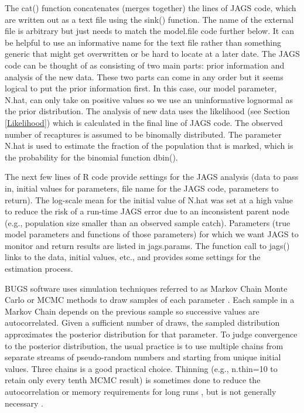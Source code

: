 \documentclass[
]{krantz}
\begin{document}
The cat() function concatenates (merges together) the lines of JAGS code, which are written out as a text file using the sink() function. The name of the external file is arbitrary but just needs to match the model.file code further below. It can be helpful to use an informative name for the text file rather than something generic that might get overwritten or be hard to locate at a later date. The JAGS code can be thought of as consisting of two main parts: prior information and analysis of the new data. These two parts can come in any order but it seems logical to put the prior information first. In this case, our model parameter, N.hat, can only take on positive values so we use an uninformative lognormal \citep{mccarthy2007} as the prior distribution. The analysis of new data uses the likelihood (see Section \ref{Likelihood}) which is calculated in the final line of JAGS code. The observed number of recaptures is assumed to be binomally distributed. The parameter N.hat is used to estimate the fraction of the population that is marked, which is the probability for the binomial function dbin().

The next few lines of R code provide settings for the JAGS analysis (data to pass in, initial values for parameters, file name for the JAGS code, parameters to return). The log-scale mean for the initial value of N.hat was set at a high value to reduce the risk of a run-time JAGS error due to an inconsistent parent node (e.g., population size smaller than an observed sample catch). Parameters (true model parameters and functions of those parameters) for which we want JAGS to monitor and return results are listed in jags.params. The function call to jags() links to the data, initial values, etc., and provides some settings for the estimation process.

BUGS software uses simulation techniques referred to as Markov Chain Monte Carlo or MCMC methods to draw samples of each parameter \citep{mccarthy2007, kéry.schaub_2011}. Each sample in a Markov Chain depends on the previous sample so successive values are autocorrelated. Given a sufficient number of draws, the sampled distribution approximates the posterior distribution for that parameter. To judge convergence to the posterior distribution, the usual practice is to use multiple chains from separate streams of pseudo-random numbers and starting from unique initial values. Three chains is a good practical choice. Thinning (e.g., n.thin=10 to retain only every tenth MCMC result) is sometimes done to reduce the autocorrelation or memory requirements for long runs \citep{gelman.hill_2006}, but is not generally necessary \citep{link.eaton2012}.
\end{document}
